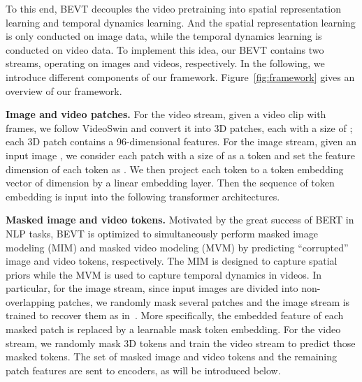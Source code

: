 \documentclass[10pt,twocolumn,letterpaper]{article}
\makeatletter
\newcommand*{\system}{BEVT\@\xspace}
\makeatother
\begin{document}
To this end, \system decouples the video pretraining into spatial representation learning and temporal dynamics learning. And the spatial representation learning is only conducted on image data, while the temporal dynamics learning is conducted on video data. To implement this idea, our \system contains two streams, operating on images and videos, respectively. In the following, we introduce different components of our framework. Figure~\ref{fig:framework} gives an overview of our framework.

\vspace{0.05in}
\noindent\textbf{Image and video patches.} For the video stream, given a video clip  with  frames,  we follow VideoSwin \cite{liu2021video} and convert it into  3D patches, each with a size of ; each 3D patch contains a 96-dimensional features.  For the image stream, given an input image , we consider each patch with a size of  as a token and set the feature dimension of each token as .  We then project each token to a token embedding vector of dimension  by a linear embedding layer. Then the sequence of token embedding is input into the following transformer architectures.


\vspace{0.05in}
\noindent\textbf{Masked image and video tokens.} Motivated by the great success of BERT in NLP tasks, \system is optimized to simultaneously perform masked image modeling (MIM) and masked video modeling (MVM) by predicting ``corrupted'' image and video tokens, respectively. The MIM is designed to capture spatial priors while the MVM is used to capture temporal dynamics in videos. In particular, for the image stream, since input images are divided into non-overlapping patches, we randomly mask several patches and the image stream is trained to recover them as in~\cite{bao2021beit}. More specifically, the embedded feature of each masked patch is replaced by a learnable mask token embedding. For the video stream, we randomly mask 3D tokens and train the video stream to predict those masked tokens. The set of masked image and video tokens and the remaining patch features are sent to encoders, as will be introduced below.
\end{document}
